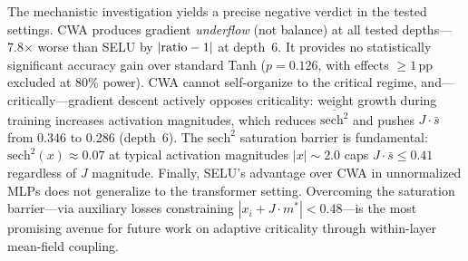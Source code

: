 \documentclass[11pt,twocolumn,letterpaper]{article}
\begin{document}
The mechanistic investigation yields a precise negative verdict in the tested settings. CWA produces gradient
\emph{underflow} (not balance) at all tested depths---7.8$\times$ worse than SELU by $|{\rm ratio}-1|$ at depth~6. It
provides no statistically significant accuracy gain over standard Tanh ($p = 0.126$, with effects $\geq 1$\,pp excluded
at 80\% power). CWA cannot self-organize to the critical regime, and---critically---gradient descent actively opposes
criticality: weight growth during training increases activation magnitudes, which reduces $\overline{\text{sech}^2}$ and
pushes $J\cdot\bar{s}$ from 0.346 to 0.286 (depth~6). The $\text{sech}^2$ saturation barrier is fundamental:
$\text{sech}^2(x) \approx 0.07$ at typical activation magnitudes $|x| \sim 2.0$ caps $J\cdot\bar{s} \leq 0.41$
regardless of $J$ magnitude. Finally, SELU's advantage over CWA in unnormalized MLPs does not generalize to the
transformer setting. Overcoming the saturation barrier---via auxiliary losses constraining
$|x_i + J\cdot m^*| < 0.48$---is the most promising avenue for future work on adaptive criticality through within-layer
mean-field coupling.



\end{document}
